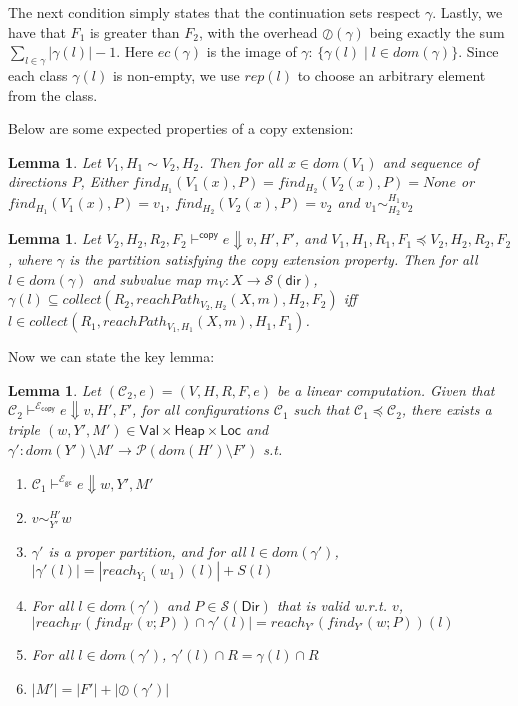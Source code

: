 \documentclass{easychair}
\newcommand{\ms}[1]{\ensuremath{\mathsf{#1}}}
\newcommand{\veq}[4]{#3 \sim^{#1}_{#2} #4}
\newcommand{\oh}[1]{\oslash(#1)}
\newcommand{\gcSem}{\ensuremath{\mathcal{E}_{\ms{gc}}}}
\newcommand{\copySem}{\ensuremath{\mathcal{E}_{\ms{copy}}}}
\newtheorem{lemma}[theorem]{Lemma}
\theoremstyle{definition}
\begin{document}
The next condition simply states that the continuation sets respect $\gamma$. Lastly, 
we have that $F_1$ is greater than $F_2$, with the overhead $\oh{\gamma}$ being exactly the sum 
$\sum_{l \in \gamma} |\gamma(l)| - 1$. Here $ec(\gamma)$ is the image of $\gamma$:
$\{\gamma(l) \mid l \in dom(\gamma)\}$. Since each class $\gamma(l)$ is non-empty,
we use $rep(l)$ to choose an arbitrary element from the class.

Below are some expected properties of a copy extension: 
\begin{lemma}
	Let $V_1,H_1 \sim V_2,H_2$. Then for all $x \in dom(V_1)$ and 
  sequence of directions $P$, 
	Either $find_{H_1}(V_1(x),P) = find_{H_2}(V_2(x),P) = None$ or 
	$find_{H_1}(V_1(x),P) = v_1$, $find_{H_2}(V_2(x),P) = v_2$ and
	$\veq{H_1}{H_2}{v_1}{v_2}$
\end{lemma}

\begin{lemma}\label{itm:aux}
Let $V_2,H_2,R_2,F_2 \vdash^{\mathsf{copy}} e \Downarrow v,H',F'$, and 
$V_1,H_1,R_1,F_1 \preceq V_2,H_2,R_2,F_2$, where $\gamma$ is the partition satisfying 
the copy extension property. Then
for all $l \in dom(\gamma)$ and subvalue map
        $m_V : X \to \mathcal{S}(\ms{dir})$,
	$\gamma(l) \subseteq collect(R_2,reachPath_{V_2,H_2}(X,m),H_2,F_2)$ iff
	$l \in collect(R_1,reachPath_{V_1,H_1}(X,m),H_1,F_1)$.
\end{lemma}

Now we can state the key lemma:

\begin{lemma}
	Let $(\mathcal{C}_2,e) = (V,H,R,F,e)$ be a linear computation. Given that 
	$\mathcal{C}_2 \vdash^{\copySem{}} e \Downarrow v,H',F'$,
	for all configurations $\mathcal{C}_1$ such that $\mathcal{C}_1 \preceq \mathcal{C}_2$,
there exists a triple
$(w,Y',M') \in \ms{Val} \times \ms{Heap} \times \ms{Loc}$ and 
	$\gamma' : dom(Y') \setminus M' \to \mathcal{P}(dom(H') \setminus F')$ s.t.
	\begin{enumerate}
			\item $\mathcal{C}_1 \vdash^{\gcSem{}} e \Downarrow w,Y',M'$
			\item $\veq{H'}{Y'}{v}{w}$
			\item $\gamma'$ is a proper partition,
                          and for all $l \in dom(\gamma')$, 
				$|\gamma'(l)| = |reach_{Y_1}(w_1)(l)| + S(l)$
                              \item For all $l \in dom(\gamma')$ and
                                $P \in \mathcal{S}(\ms{Dir})$ that is valid w.r.t. $v$, 
                                $|reach_{H'}(find_{H'}(v;P)) \cap \gamma'(l)| = 
				reach_{Y'}(find_{Y'}(w;P))(l)$
			\item For all $l \in dom(\gamma')$, $\gamma'(l) \cap R = \gamma(l) \cap R$
			\item $|M'| = |F'| + |\oh{\gamma'}|$
	\end{enumerate}
\end{lemma}
\end{document}
